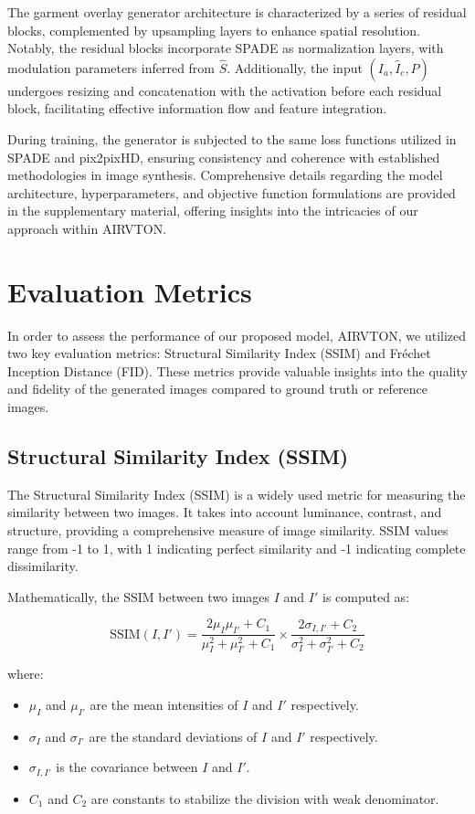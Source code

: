     The garment overlay generator architecture is characterized by a series of residual blocks, complemented by upsampling layers to enhance spatial resolution. Notably, the residual blocks incorporate SPADE as normalization layers, with modulation parameters inferred from \( \hat{S} \). Additionally, the input \( (I_a, \hat{I}_c, P) \) undergoes resizing and concatenation with the activation before each residual block, facilitating effective information flow and feature integration.

    During training, the generator is subjected to the same loss functions utilized in SPADE and pix2pixHD, ensuring consistency and coherence with established methodologies in image synthesis. Comprehensive details regarding the model architecture, hyperparameters, and objective function formulations are provided in the supplementary material, offering insights into the intricacies of our approach within AIRVTON.

\section{Evaluation Metrics}

In order to assess the performance of our proposed model, AIRVTON, we utilized two key evaluation metrics: Structural Similarity Index (SSIM) and Fréchet Inception Distance (FID). These metrics provide valuable insights into the quality and fidelity of the generated images compared to ground truth or reference images.

\subsection{Structural Similarity Index (SSIM)}

The Structural Similarity Index (SSIM) is a widely used metric for measuring the similarity between two images. It takes into account luminance, contrast, and structure, providing a comprehensive measure of image similarity. SSIM values range from -1 to 1, with 1 indicating perfect similarity and -1 indicating complete dissimilarity.

Mathematically, the SSIM between two images \(I\) and \(I'\) is computed as:

\[
\text{SSIM}(I, I') = \frac{{2 \mu_I \mu_{I'} + C_1}}{{\mu_I^2 + \mu_{I'}^2 + C_1}} \times \frac{{2 \sigma_{I,I'} + C_2}}{{\sigma_I^2 + \sigma_{I'}^2 + C_2}}
\]

where:
\begin{itemize}
  \item \(\mu_I\) and \(\mu_{I'}\) are the mean intensities of \(I\) and \(I'\) respectively.
  \item \(\sigma_I\) and \(\sigma_{I'}\) are the standard deviations of \(I\) and \(I'\) respectively.
  \item \(\sigma_{I,I'}\) is the covariance between \(I\) and \(I'\).
  \item \(C_1\) and \(C_2\) are constants to stabilize the division with weak denominator.
\end{itemize}

